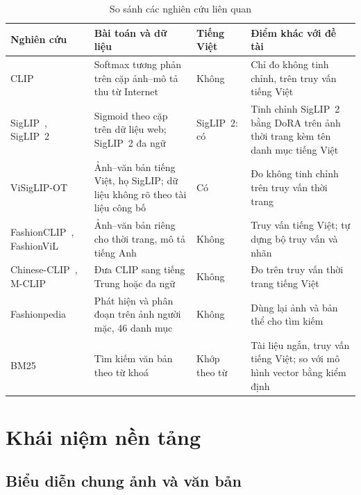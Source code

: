 \begin{table}[H]
\centering
\caption{So sánh các nghiên cứu liên quan}
\label{tab:so-sanh-nghien-cuu}
\footnotesize
\begin{tabularx}{\textwidth}{@{}>{\raggedright\arraybackslash}p{3.2cm} >{\raggedright\arraybackslash}X >{\raggedright\arraybackslash}p{1.6cm} >{\raggedright\arraybackslash}X@{}}
\toprule
\textbf{Nghiên cứu} & \textbf{Bài toán và dữ liệu} & \textbf{Tiếng Việt} & \textbf{Điểm khác với đề tài} \\
\midrule
CLIP~\cite{radford2021clip} & Softmax tương phản trên cặp ảnh--mô tả thu từ Internet & Không & Chỉ đo không tinh chỉnh, trên truy vấn tiếng Việt \\
SigLIP~\cite{zhai2023siglip}, SigLIP~2~\cite{tschannen2025siglip2} & Sigmoid theo cặp trên dữ liệu web; SigLIP~2 đa ngữ & SigLIP~2: có & Tinh chỉnh SigLIP~2 bằng DoRA trên ảnh thời trang kèm tên danh mục tiếng Việt \\
ViSigLIP-OT~\cite{viclipot2026} & Ảnh--văn bản tiếng Việt, họ SigLIP; dữ liệu không rõ theo tài liệu công bố & Có & Đo không tinh chỉnh trên truy vấn thời trang \\
FashionCLIP~\cite{chia2022fashionclip}, FashionViL~\cite{han2022fashionvil} & Ảnh--văn bản riêng cho thời trang, mô tả tiếng Anh & Không & Truy vấn tiếng Việt; tự dựng bộ truy vấn và nhãn \\
Chinese-CLIP~\cite{yang2022chineseclip}, M-CLIP~\cite{carlsson2022mclip} & Đưa CLIP sang tiếng Trung hoặc đa ngữ & Không & Đo trên truy vấn thời trang tiếng Việt \\
Fashionpedia~\cite{jia2020fashionpedia} & Phát hiện và phân đoạn trên ảnh người mặc, 46 danh mục & Không & Dùng lại ảnh và bản thể cho tìm kiếm \\
BM25~\cite{robertson2009bm25} & Tìm kiếm văn bản theo từ khoá & Khớp theo từ & Tài liệu ngắn, truy vấn tiếng Việt; so với mô hình vector bằng kiểm định \\
\bottomrule
\end{tabularx}
\end{table}

\section{Khái niệm nền tảng}
\label{sec:khai-niem-nen-tang}

\subsection{Biểu diễn chung ảnh và văn bản}
\label{sec:bieu-dien-chung}

